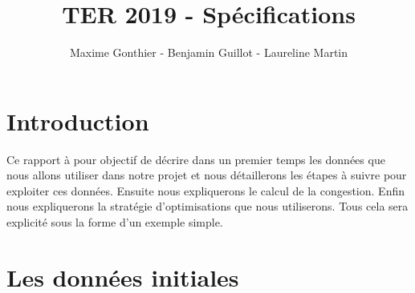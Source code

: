 \documentclass[a4paper,11pt]{article}
\title{TER 2019 - Spécifications}
\author{Maxime Gonthier - Benjamin Guillot - Laureline Martin}
\begin{document}
	\clearpage
	\maketitle

\newpage
\tableofcontents

\newpage
\section{Introduction}
Ce rapport à pour objectif de décrire dans un premier temps les données que nous allons utiliser dans notre projet et nous détaillerons les étapes à suivre pour exploiter ces données. Ensuite nous expliquerons le calcul de la congestion. Enfin nous expliquerons la stratégie d'optimisations que nous utiliserons. Tous cela sera explicité sous la forme d'un exemple simple.

\section{Les données initiales}
\end{document}

